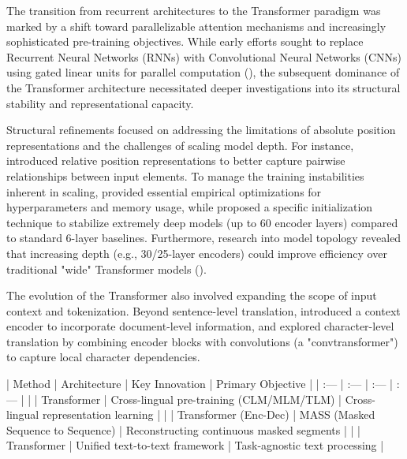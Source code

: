 \documentclass[11pt]{article}
\begin{document}
The transition from recurrent architectures to the Transformer paradigm was marked by a shift toward parallelizable attention mechanisms and increasingly sophisticated pre-training objectives. While early efforts sought to replace Recurrent Neural Networks (RNNs) with Convolutional Neural Networks (CNNs) using gated linear units for parallel computation (\citep{1705.03122}), the subsequent dominance of the Transformer architecture necessitated deeper investigations into its structural stability and representational capacity.

Structural refinements focused on addressing the limitations of absolute position representations and the challenges of scaling model depth. For instance, \citep{1803.02155} introduced relative position representations to better capture pairwise relationships between input elements. To manage the training instabilities inherent in scaling, \citep{1804.00247} provided essential empirical optimizations for hyperparameters and memory usage, while \citep{2008.07772} proposed a specific initialization technique to stabilize extremely deep models (up to 60 encoder layers) compared to standard 6-layer baselines. Furthermore, research into model topology revealed that increasing depth (e.g., 30/25-layer encoders) could improve efficiency over traditional "wide" Transformer models (\citep{1906.01787}).

The evolution of the Transformer also involved expanding the scope of input context and tokenization. Beyond sentence-level translation, \citep{1810.03581} introduced a context encoder to incorporate document-level information, and \citep{2004.14788} explored character-level translation by combining encoder blocks with convolutions (a "convtransformer") to capture local character dependencies.

| Method | Architecture | Key Innovation | Primary Objective |
| :--- | :--- | :--- | :--- |
| \citep{1901.07291} | Transformer | Cross-lingual pre-training (CLM/MLM/TLM) | Cross-lingual representation learning |
| \citep{1905.02450} | Transformer (Enc-Dec) | MASS (Masked Sequence to Sequence) | Reconstructing continuous masked segments |
| \citep{1910.10683} | Transformer | Unified text-to-text framework | Task-agnostic text processing |
\end{document}
